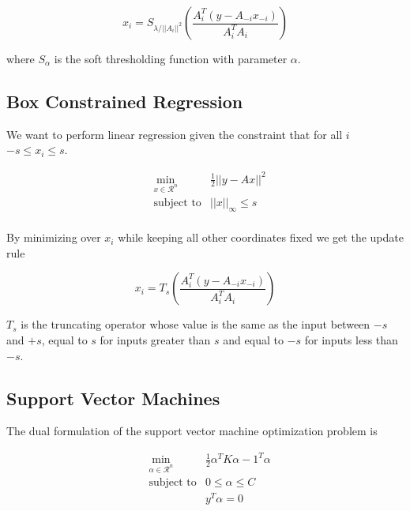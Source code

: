 \documentclass[twoside]{article}
\begin{document}
\begin{equation*}
x_i = S_{\lambda / ||A_i||^2}\left(\frac{A_i^T\left(y-A_{-i}x_{-i}\right)}{A_i^TA_i}\right)
\end{equation*}

where $S_\alpha$ is the soft thresholding function with parameter $\alpha$.

\subsection{Box Constrained Regression}

We want to perform linear regression given the constraint that for all $i$ $-s \leq x_i \leq s$.

\begin{equation*}
\begin{aligned}
& \displaystyle \min_{x \in \mathcal{R}^n} & \frac{1}{2}||y-Ax||^2 \\ 
& \text{subject to}                        & ||x||_{\infty} \leq s \\
\end{aligned}
\end{equation*}

By minimizing over $x_i$ while keeping all other coordinates fixed we get the update rule

\begin{equation*}
x_i = T_s\left( \frac{A_i^T\left(y-A_{-i}x_{-i}\right)} {A_i^TA_i} \right)
\end{equation*}

$T_s$ is the truncating operator whose value is the same as the input between $-s$ and $+s$, equal to $s$ for inputs greater than $s$ and equal to $-s$ for inputs less than $-s$.

\subsection{Support Vector Machines}

The dual formulation of the support vector machine optimization problem is

\begin{equation*}
\begin{aligned}
& \displaystyle \min_{\alpha \in \mathcal{R}^n} & \frac{1}{2}\alpha^TK\alpha - 1^T\alpha \\ 
& \text{subject to}                             & 0 \leq \alpha \leq C                   \\
&												& y^T\alpha = 0
\end{aligned}
\end{equation*} 
\end{document}
